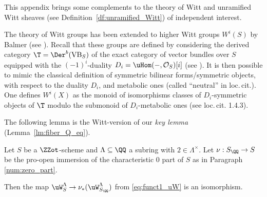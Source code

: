This appendix brings some complements to the theory of Witt and unramified Witt sheaves
(see Definition~\ref{df:unramified_Witt}) of independent interest.

\begin{num}\label{num:Balmer}
The theory of Witt groups has been extended to
higher Witt groups $W^i(S)$ by Balmer (see \eg \cite{BalmerBasic}).
Recall that these groups are defined by considering the deri\-ved category
$\T=\Der^b(\mathrm{VB}_S)$ of the exact category of vector bundles over $S$
equipped with the $(-1)^i$-duality $D_i=\uHom(-,\mathcal O_S)[i]$
(see \cite[1.4.12]{BalmerBasic}).
It is then possible to mimic the classical definition of
symmetric bilinear forms/symmetric objects, with respect to the duality $D_i$, and metabolic ones (called ``neutral'' in loc.\,cit.).
One defines $W^i(X)$ as the monoid of isomorphisms classes of
$D_i$-symmetric objects of $\T$ modulo the submonoid of $D_i$-metabolic ones (see loc.\,cit. 1.4.3).

The following lemma is the Witt-version of our \emph{key lemma} (Lemma~\ref{lm:fiber_Q_eq}).
\end{num}
\begin{prop}\label{prop:Witt_2inverted}
Let $S$ be a $\ZZot$-scheme and $\Lambda \subseteq \QQ$ a subring with $2 \in \Lambda^\times$.
Let $\nu:S_\QQ \to S$ be the pro-open immersion of the characteristic $0$ part of $S$
as in Paragraph \ref{num:zero_part}.

Then the map $\uW_S^\Lambda \to \nu_*(\uW_{S_\QQ}^\Lambda)$ from \eqref{eq:funct1_uW} is an isomorphism.
\end{prop}
